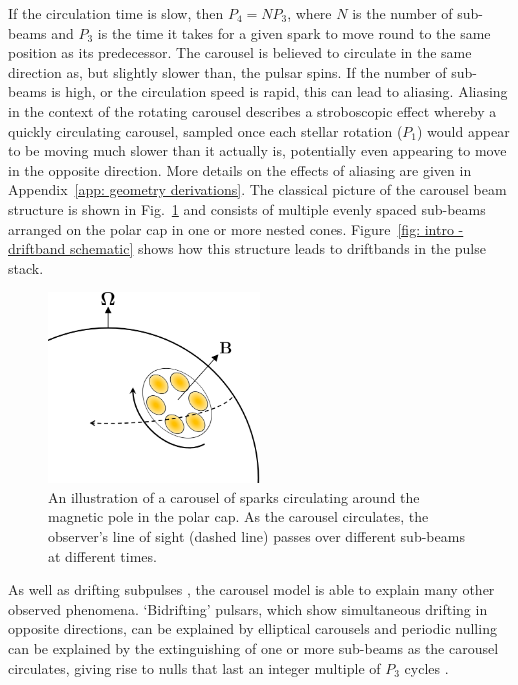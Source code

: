 If the circulation time is slow, then $P_4 = NP_3$, where $N$ is the number of sub-beams and $P_3$ is the time it takes for a given spark to move round to the same position as its predecessor. The carousel is believed to circulate in the same direction as, but slightly slower than, the pulsar spins. If the number of sub-beams is high, or the circulation speed is rapid, this can lead to aliasing. Aliasing in the context of the rotating carousel describes a stroboscopic effect whereby a quickly circulating carousel, sampled once each stellar rotation ($P_1$) would appear to be moving much slower than it actually is, potentially even appearing to move in the opposite direction. More details on the effects of aliasing are given in Appendix~\ref{app: geometry derivations}. The classical picture of the carousel beam structure is shown in Fig.~\ref{fig: intro - carousel schematic} and consists of multiple evenly spaced sub-beams arranged on the polar cap in one or more nested cones. Figure~\ref{fig: intro - driftband schematic} shows how this structure leads to driftbands in the pulse stack.
\begin{figure}
	\centering
	\includegraphics[width=0.5\textwidth]{Figures/Introduction/carousel_schematic}
    \caption[A carousel of sub-beams]{An illustration of a carousel of sparks circulating around the magnetic pole in the polar cap. As the carousel circulates, the observer's line of sight (dashed line) passes over different sub-beams at different times.}
    \label{fig: intro - carousel schematic} 
\end{figure}
As well as drifting subpulses \citep[e.g.][]{GSxx2000,GMxx2001,WESx2006,WSEx2007}, the carousel model is able to explain many other observed phenomena. `Bidrifting' pulsars, which show simultaneous drifting in opposite directions, can be explained by elliptical carousels \citep{QLZ+2004, Wxxx2016, WWxx2017, SLxx2017, SLWM2020} and periodic nulling can be explained by the extinguishing of one or more sub-beams as the carousel circulates, giving rise to nulls that last an integer multiple of $P_3$ cycles \citep{HRxx2007, HRxx2009, RWxx2008}.

